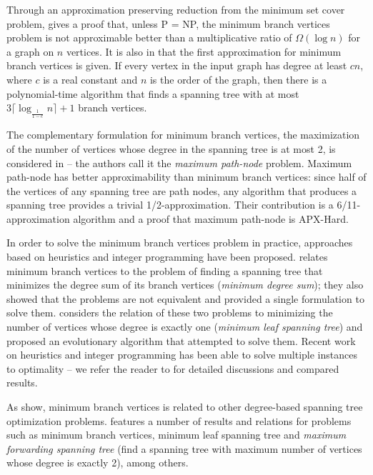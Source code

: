 \documentclass[12pt]{article}
\begin{document}
Through an approximation preserving reduction from the minimum set cover problem, \cite{salamon2010} gives a proof that, unless P = NP, the minimum branch vertices problem is not approximable better than a multiplicative ratio of $\Omega(\log n)$ for a graph on $n$ vertices.
It is also in \cite{salamon2010} that the first approximation for minimum branch vertices is given.
If every vertex in the input graph has degree at least $cn$, where $c$ is a real constant and $n$ is the order of the graph, then there is a polynomial-time algorithm that finds a spanning tree with at most $3\lceil \log_{\frac{1}{1 - c}}n\rceil + 1$ branch vertices. 

The complementary formulation for minimum branch vertices, the maximization of the number of vertices whose degree in the spanning tree is at most 2, is considered in \cite{chimani2015} -- the authors call it the \emph{maximum path-node} problem. 
Maximum path-node has better approximability than minimum branch vertices: since half of the vertices of any spanning tree are path nodes, any algorithm that produces a spanning tree provides a trivial 1/2-approximation.
Their contribution is a 6/11-approximation algorithm and a proof that maximum path-node is APX-Hard.

In order to solve the minimum branch vertices problem in practice, approaches based on heuristics and integer programming have been proposed.
\cite{cerulli2009} relates minimum branch vertices to the problem of finding a spanning tree that minimizes the degree sum of its branch vertices (\emph{minimum degree sum}); they also showed that the problems are not equivalent and provided a single formulation to solve them.
\cite{cerrone2014} considers the relation of these two problems to minimizing the number of vertices whose degree is exactly one (\emph{minimum leaf spanning tree}) and proposed an evolutionary algorithm that attempted to solve them.
Recent work on heuristics and integer programming has been able to solve multiple instances to optimality -- we refer the reader to \cite{marin2015, melo2016, silvestri2017} for detailed discussions and compared results.

As \cite{cerulli2009, cerrone2014} show, minimum branch vertices is related to other degree-based spanning tree optimization problems.
\cite{salamon2010} features a number of results and relations for problems such as minimum branch vertices, minimum leaf spanning tree and \emph{maximum forwarding spanning tree} (find a spanning tree with maximum number of vertices whose degree is exactly 2), among others.
\end{document}
